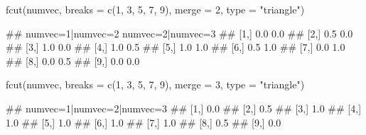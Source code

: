 \begin{Schunk}
% --begin: "fcut.merge"
\begin{Sinput}
fcut(numvec, breaks = c(1, 3, 5, 7, 9), merge = 2, type = "triangle")
\end{Sinput}
\begin{Soutput}
##       numvec=1|numvec=2 numvec=2|numvec=3
##  [1,]               0.0               0.0
##  [2,]               0.5               0.0
##  [3,]               1.0               0.0
##  [4,]               1.0               0.5
##  [5,]               1.0               1.0
##  [6,]               0.5               1.0
##  [7,]               0.0               1.0
##  [8,]               0.0               0.5
##  [9,]               0.0               0.0
\end{Soutput}
\begin{Sinput}
fcut(numvec, breaks = c(1, 3, 5, 7, 9), merge = 3, type = "triangle")
\end{Sinput}
\begin{Soutput}
##       numvec=1|numvec=2|numvec=3
##  [1,]                        0.0
##  [2,]                        0.5
##  [3,]                        1.0
##  [4,]                        1.0
##  [5,]                        1.0
##  [6,]                        1.0
##  [7,]                        1.0
##  [8,]                        0.5
##  [9,]                        0.0
\end{Soutput}
%
% --end: "fcut.merge"
\end{Schunk}
